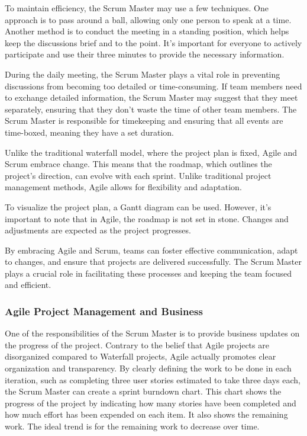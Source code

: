To maintain efficiency, the Scrum Master may use a few techniques. One
approach is to pass around a ball, allowing only one person to speak at
a time. Another method is to conduct the meeting in a standing position,
which helps keep the discussions brief and to the point. It's important
for everyone to actively participate and use their three minutes to
provide the necessary information.

During the daily meeting, the Scrum Master plays a vital role in
preventing discussions from becoming too detailed or time-consuming. If
team members need to exchange detailed information, the Scrum Master may
suggest that they meet separately, ensuring that they don't waste the
time of other team members. The Scrum Master is responsible for
timekeeping and ensuring that all events are time-boxed, meaning they
have a set duration.

Unlike the traditional waterfall model, where the project plan is fixed,
Agile and Scrum embrace change. This means that the roadmap, which
outlines the project's direction, can evolve with each sprint. Unlike
traditional project management methods, Agile allows for flexibility and
adaptation.

To visualize the project plan, a Gantt diagram can be used. However,
it's important to note that in Agile, the roadmap is not set in stone.
Changes and adjustments are expected as the project progresses.

By embracing Agile and Scrum, teams can foster effective communication,
adapt to changes, and ensure that projects are delivered successfully.
The Scrum Master plays a crucial role in facilitating these processes
and keeping the team focused and efficient.

\subsubsection{Agile Project Management and Business}

One of the responsibilities of the Scrum Master is to provide business
updates on the progress of the project. Contrary to the belief that
Agile projects are disorganized compared to Waterfall projects, Agile
actually promotes clear organization and transparency. By clearly
defining the work to be done in each iteration, such as completing three
user stories estimated to take three days each, the Scrum Master can
create a sprint burndown chart. This chart shows the progress of the
project by indicating how many stories have been completed and how much
effort has been expended on each item. It also shows the remaining work.
The ideal trend is for the remaining work to decrease over time.

